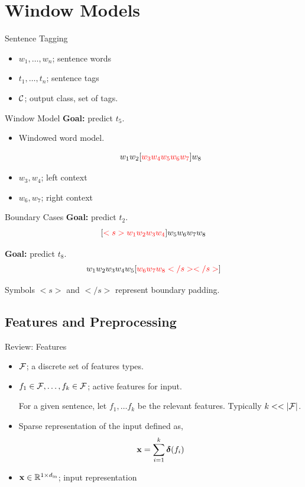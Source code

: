 \documentclass{beamer}
\begin{document}
\section{Window Models}

\begin{frame}{Sentence Tagging}
  \begin{itemize}
  \item $w_1, \ldots, w_n$; sentence words
  \item $t_1, \ldots, t_n$; sentence tags
  \item $\mathcal{C}$; output class, set of tags.  
  \end{itemize}  
\end{frame}


\begin{frame}{Window Model}
  \textbf{Goal:} predict $t_5$.

  
  \begin{itemize}
  \item Windowed word model. 
  
  \[ w_1 w_2 [\textcolor{red}{w_3 w_4 w_5 w_6 w_7}] w_8 \] 

  \item $w_3, w_4$; left context  
  \item $w_6, w_7$; right context  
  \end{itemize}
\end{frame}


\begin{frame}{Boundary Cases}
  \textbf{Goal:} predict $t_2$.
  \[ [\textcolor{red}{ <s> w_1 w_2 w_3 w_4}] w_5 w_6 w_7 w_8 \] 


  \textbf{Goal:} predict $t_8$.
  \[  w_1 w_2 w_3 w_4 w_5 [\textcolor{red}{w_6 w_7 w_8  </s> </s>}] \] 

  Symbols $<s>$ and $</s>$ represent boundary padding. 
\end{frame}

\subsection{Features and Preprocessing}

\begin{frame}{Review: Features}
  \begin{itemize}
  \item   $\mathcal{F}$; a discrete set of features types. 
  \item   $f_1\in\mathcal{F}, \ldots , f_k\in\mathcal{F}$; active features for input.  
    \air 
    
    For a given sentence, let $f_1, \ldots f_k$  be the relevant features.  Typically $k << |\mathcal{F}|$.
\air

  \item Sparse representation of the input defined as,
    \[\mathbf{x} = \sum_{i=1}^k \boldsymbol{\delta}(f_i) \]
  \item $\mathbf{x} \in \mathbb{R}^{1\times {d_{\mathrm{in}}}}$; input representation 
  \end{itemize}

\end{frame}
\end{document}
